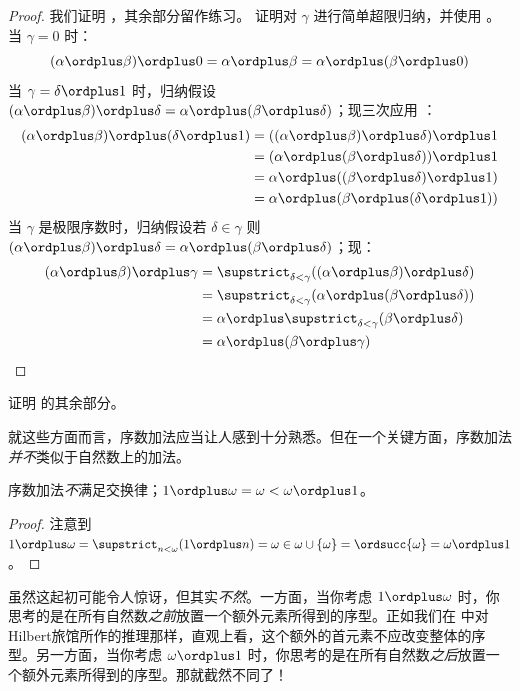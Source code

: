 \documentclass[../../../include/open-logic-section]{subfiles}
\begin{document}
\begin{proof}
我们证明 ，其余部分留作练习。
证明对 $\gamma$ 进行简单超限归纳，并使用
。
当 $\gamma = 0$ 时：
\[
(\alpha \ordplus  \beta) \ordplus  0 = \alpha \ordplus  \beta  = \alpha \ordplus  (\beta \ordplus  0)
\]
当 $\gamma = \delta\ordplus 1$ 时，归纳假设 $(\alpha
\ordplus  \beta) \ordplus  \delta = \alpha \ordplus  (\beta \ordplus
\delta)$；现三次应用 ：
\begin{align*}
	(\alpha \ordplus  \beta) \ordplus  (\delta \ordplus  1) & = ((\alpha \ordplus  \beta) \ordplus  \delta)\ordplus 1\\
	& = (\alpha \ordplus  (\beta \ordplus  \delta)) \ordplus  1\\
	& = \alpha \ordplus  ((\beta \ordplus  \delta)\ordplus 1)\\
	& = \alpha \ordplus  (\beta \ordplus  (\delta\ordplus 1))
\end{align*}
当 $\gamma$ 是极限序数时，归纳假设若
$\delta \in \gamma$ 则 $(\alpha \ordplus  \beta) \ordplus  \delta =
\alpha \ordplus  (\beta \ordplus  \delta)$；现：
\begin{align*}
	(\alpha \ordplus  \beta) \ordplus  \gamma & = \supstrict_{\delta < \gamma}((\alpha \ordplus  \beta) \ordplus  \delta) \\
	&= \supstrict_{\delta < \gamma}(\alpha \ordplus  (\beta \ordplus  \delta))\\
	&= \alpha \ordplus  \supstrict_{\delta < \gamma}(\beta \ordplus  \delta)\\
	& = \alpha \ordplus  (\beta \ordplus  \gamma)
\end{align*}
\end{proof}

\begin{prob}
证明
 的其余部分。
\end{prob}

就这些方面而言，序数加法应当让人感到十分熟悉。但在一个关键方面，序数加法\emph{并不}类似于自然数上的加法。

\begin{prop}
序数加法\emph{不}满足交换律；$1 \ordplus  \omega = \omega <
\omega \ordplus  1$。
\end{prop}

\begin{proof}
注意到 $1 \ordplus  \omega = \supstrict_{n < \omega} (1 \ordplus n)
= \omega \in \omega \cup \{\omega\} = \ordsucc{\omega} = \omega
\ordplus  1$。
\end{proof}
\noindent
虽然这起初可能令人惊讶，但其实\emph{不然}。一方面，当你考虑 $1 \ordplus  \omega$ 时，你思考的是在所有自然数\emph{之前}放置一个额外元素所得到的序型。正如我们在
 中对Hilbert旅馆所作的推理那样，直观上看，这个额外的首元素不应改变整体的序型。另一方面，当你考虑 $\omega \ordplus  1$ 时，你思考的是在所有自然数\emph{之后}放置一个额外元素所得到的序型。那就截然不同了！
\end{document}
